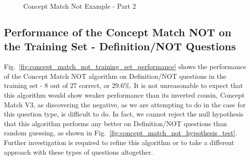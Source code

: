 \begin{figure}
\centering
\vspace{0.75in}
\caption{Concept Match Not Example - Part 2}
\label{fig:concept_match_not_example_part_2}
\end{figure}

\subsection{Performance of the Concept Match NOT on the Training Set - Definition/NOT Questions}

Fig.~\ref{fig:concept_match_not_training_set_performance} shows the performance of the Concept Match NOT algorithm on Definition/NOT questions in the training set - 8 out of 27 correct, or 29.6\%.  It is not unreasonable to expect that this algorithm would show weaker performance than its inverted cousin, Concept Match V3, as discovering the negative, as we are attempting to do in the case for this question type, is difficult to do.  In fact, we cannot reject the null hypothesis that this algorithm performs any better on Definition/NOT questions than random guessing, as shown in Fig.~\ref{fig:concept_match_not_hypothesis_test}.  Further investigation is required to refine this algorithm or to take a different approach with these types of questions altogether.



